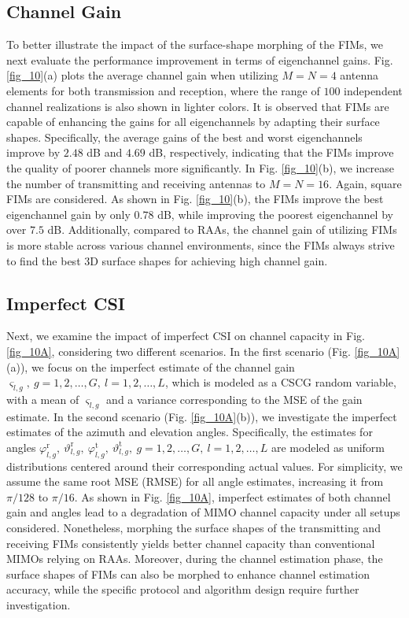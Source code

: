 \documentclass[lettersize,journal]{IEEEtran}
\begin{document}
\subsection{Channel Gain}\label{sec4_3}
To better illustrate the impact of the surface-shape morphing of the FIMs, we next evaluate the performance improvement in terms of eigenchannel gains. Fig. \ref{fig_10}(a) plots the average channel gain when utilizing $M = N = 4$ antenna elements for both transmission and reception, where the range of $100$ independent channel realizations is also shown in lighter colors. It is observed that FIMs are capable of enhancing the gains for all eigenchannels by adapting their surface shapes. Specifically, the average gains of the best and worst eigenchannels improve by $2.48$ dB and $4.69$ dB, respectively, indicating that the FIMs improve the quality of poorer channels more significantly. In Fig. \ref{fig_10}(b), we increase the number of transmitting and receiving antennas to $M = N = 16$. Again, square FIMs are considered. As shown in Fig. \ref{fig_10}(b), the FIMs improve the best eigenchannel gain by only $0.78$ dB, while improving the poorest eigenchannel by over $7.5$ dB. Additionally, compared to RAAs, the channel gain of utilizing FIMs is more stable across various channel environments, since the FIMs always strive to find the best 3D surface shapes for achieving high channel gain.

\subsection{Imperfect CSI}
Next, we examine the impact of imperfect CSI on channel capacity in Fig. \ref{fig_10A}, considering two different scenarios. In the first scenario (Fig. \ref{fig_10A}(a)), we focus on the imperfect estimate of the channel gain $\varsigma _{l,g},\ g=1,2,\ldots,G,\ l=1,2,\ldots,L$, which is modeled as a CSCG random variable, with a mean of $\varsigma_{l,g}$ and a variance corresponding to the MSE of the gain estimate. In the second scenario (Fig. \ref{fig_10A}(b)), we investigate the imperfect estimates of the azimuth and elevation angles. Specifically, the estimates for angles $\varphi_{l,g}^{\textrm{r}},\ \vartheta_{l,g}^{\textrm{r}},\ \varphi_{l,g}^{\textrm{t}},\ \vartheta_{l,g}^{\textrm{t}},\ g=1,2,\ldots,G,\ l=1,2,\ldots,L$ are modeled as uniform distributions centered around their corresponding actual values. For simplicity, we assume the same root MSE (RMSE) for all angle estimates, increasing it from $\pi/128$ to $\pi/16$. As shown in Fig. \ref{fig_10A}, imperfect estimates of both channel gain and angles lead to a degradation of MIMO channel capacity under all setups considered. Nonetheless, morphing the surface shapes of the transmitting and receiving FIMs consistently yields better channel capacity than conventional MIMOs relying on RAAs. Moreover, during the channel estimation phase, the surface shapes of FIMs can also be morphed to enhance channel estimation accuracy, while the specific protocol and algorithm design require further investigation.
\end{document}
